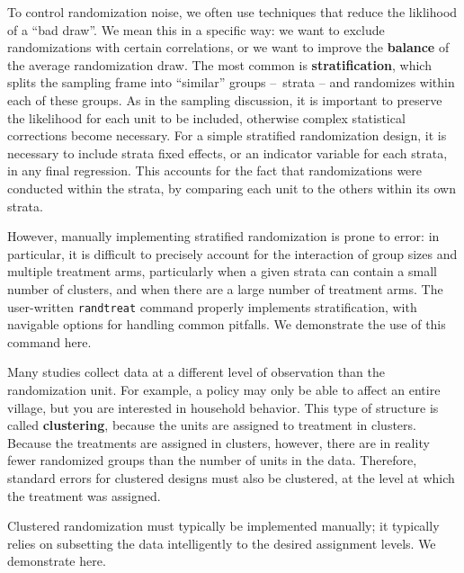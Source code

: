 To control randomization noise, we often use techniques
that reduce the liklihood of a ``bad draw''.\cite{athey2017econometrics}
We mean this in a specific way: we want to exclude
randomizations with certain correlations,
or we want to improve the \textbf{balance}
of the average randomization draw.\cite{bruhn2009pursuit}
The most common is \textbf{stratification},
which splits the sampling frame into ``similar'' groups – strata –
and randomizes within each of these groups.
As in the sampling discussion, it is important to
preserve the likelihood for each unit to be included,
otherwise complex statistical corrections become necessary.
For a simple stratified randomization design,
it is necessary to include strata fixed effects,
or an indicator variable for each strata, in any final regression.
This accounts for the fact that randomizations were conducted within the strata,
by comparing each unit to the others within its own strata.

However, manually implementing stratified randomization
is prone to error: in particular, it is difficult to precisely account
for the interaction of group sizes and multiple treatment arms,
particularly when a given strata can contain a small number of clusters,
and when there are a large number of treatment arms.\cite{carril2017dealing}
The user-written \texttt{randtreat} command
properly implements stratification,
with navigable options for handling common pitfalls.
We demonstrate the use of this command here.

{
}

Many studies collect data at a different level of observation than the randomization unit.
For example, a policy may only be able to affect an entire village,
but you are interested in household behavior.
This type of structure is called \textbf{clustering},
because the units are assigned to treatment in clusters.
Because the treatments are assigned in clusters, however,
there are in reality fewer randomized groups than the number of units in the data.
Therefore, standard errors for clustered designs must also be clustered,
at the level at which the treatment was assigned.

Clustered randomization must typically be implemented manually;
it typically relies on subsetting the data intelligently
to the desired assignment levels.
We demonstrate here.

